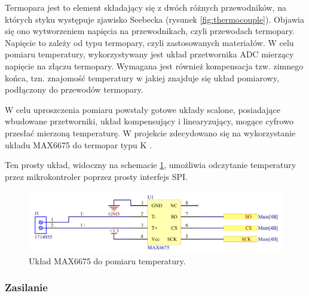 Termopara jest to element składający się z dwóch różnych przewodników, na których styku występuje zjawisko Seebecka (rysunek \ref{fig:thermocouple}). Objawia się ono wytworzeniem napięcia na przewodnikach, czyli przewodach termopary.
Napięcie to zależy od typu termopary, czyli zastosowanych materiałów. W celu pomiaru temperatury, wykorzystywany jest układ przetwornika ADC mierzący napięcie na złączu termopary.
Wymagana jest również kompensacja tzw. zimnego końca, tzn. znajomość temperatury w jakiej znajduje się układ pomiarowy, podłączony do przewodów termopary.

W celu uproszczenia pomiaru powstały gotowe układy scalone, posiadające wbudowane przetworniki, układ kompensujący i linearyzujący, mogące cyfrowo przesłać mierzoną temperaturę.
W projekcie zdecydowano się na wykorzystanie układu MAX6675 do termopar typu K \cite{max6675}.

Ten prosty układ, widoczny na schemacie \ref{fig:max6675schemat}, umożliwia odczytanie temperatury przez mikrokontroler poprzez
prosty interfejs SPI.

\begin{figure}[h!]
    \begin{center}
        \includegraphics[width = 17cm]{images/max6675_3.png}
        \caption{Układ MAX6675 do pomiaru temperatury.}
        \label{fig:max6675schemat}
    \end{center}
\end{figure}








\subsubsection{Zasilanie}


